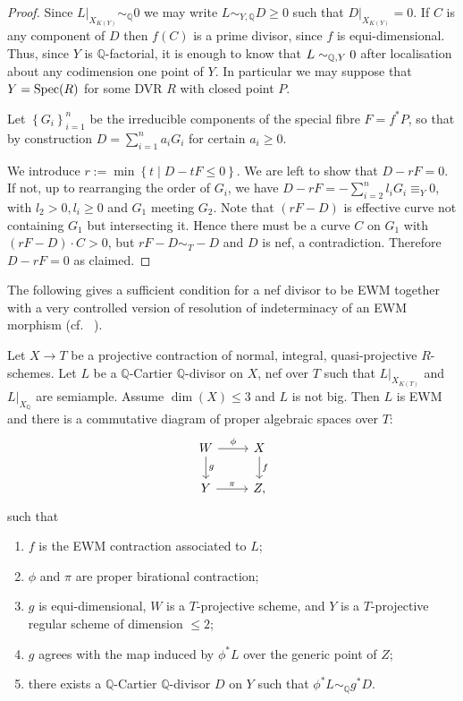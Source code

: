 \begin{proof}
	Since $L|_{X_{K(Y)}} \sim_{\mathbb{Q}} 0$ we may write $L\sim_{Y, \mathbb{Q}} D\geq 0$ such that $D|_{X_{K(Y)}}=0$. If $C$ is any component of $D$ then $f(C)$ is a prime divisor, since $f$ is equi-dimensional. Thus, since $Y$ is $\mathbb{Q}$-factorial, it is enough to know that $L \sim_{\mathbb{Q},Y} 0$ after localisation about any codimension one point of $Y$. In particular we may suppose that $Y= \operatorname{Spec} (R)$ for some DVR $R$ with closed point $P$.
	
	Let $\left\{G_i \right\}_{i=1}^n$ be the irreducible components of the special fibre $F=f^*P$, so that by construction $D = \sum_{i=1}^n a_i G_i$ for certain $a_i \geq 0$.	
	
	We introduce $r:= \min \left\{ t \mid D -tF \leq 0 \right\}$. We are left to show that $D-rF=0$. 
	If not, up to rearranging the order of $G_i$, we have $D-rF=-\sum_{i=2}^n l_i G_i \equiv_Y 0$, with $l_2 >0, l_i \geq 0$ and $G_{1}$ meeting $G_{2}$. Note that $(rF-D)$ is effective curve not containing $G_{1}$ but intersecting it. Hence there must be a curve $C$ on $G_{1}$ with $(rF-D) \cdot C >0$, but $rF-D \sim_{T} -D$ and $D$ is nef, a contradiction. Therefore $D-rF=0$ as claimed.
\end{proof}


The following gives a sufficient condition for a nef divisor to be EWM together with a very controlled version of resolution of indeterminacy of an EWM morphism (cf.~ \cite[Lemma 9.25]{bhatt2020}).

\begin{lemma}\label{two}
	Let $X \to T$ be a projective contraction of normal, integral, quasi-projective $R$-schemes.
	Let $L$ be a $\mathbb{Q}$-Cartier $\mathbb{Q}$-divisor on $X$, nef over $T$ such that $L|_{X_{K(T)}}$ and $L|_{X_{\mathbb{Q}}}$ are semiample.
	Assume $\dim (X) \leq 3$ and $L$ is not big. 
	Then $L$ is EWM and there is a commutative diagram of proper algebraic spaces over $T$:
	\[
	\begin{tikzcd}
	W \arrow[d, "g"] \arrow[r, "\phi"] & X \arrow[d, "f"] \\
	Y \arrow[r, "\pi"]                 & Z      ,        
	\end{tikzcd}
	\]
	such that 
	\begin{enumerate}
		\item $f$ is the EWM contraction associated to $L$;
		\item $\phi$ and $\pi$ are proper birational contraction;
		\item  $g$ is equi-dimensional, $W$ is a $T$-projective scheme, and $Y$ is a $T$-projective regular scheme of dimension $\leq 2$;
		\item $g$ agrees with the map induced by $\phi^*L$ over the generic point of $Z$;
		\item  there exists a $\mathbb{Q}$-Cartier $\mathbb{Q}$-divisor $D$ on $Y$ such that $\phi^{*}L \sim_{\mathbb{Q}} g^{*}D$.
	\end{enumerate}  
\end{lemma}

